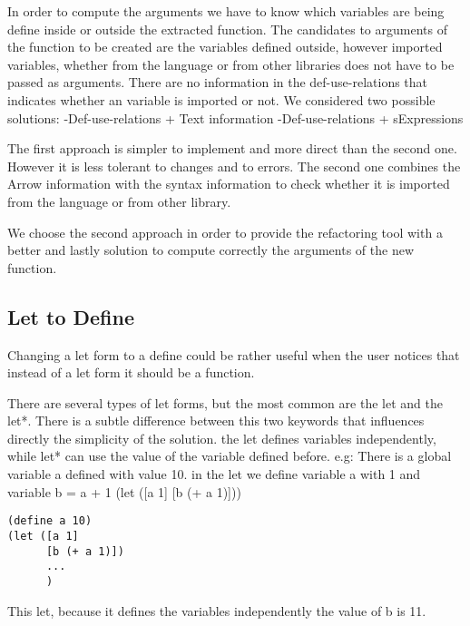 In order to compute the arguments we have to know which variables are being define
inside or outside the extracted function.
The candidates to arguments of the function to be created are the variables defined
outside, however imported variables, whether from the language or from other libraries
does not have to be passed as arguments.
There are no information in the def-use-relations that indicates whether an variable
is imported or not.
We considered two possible solutions:
  -Def-use-relations + Text information
  -Def-use-relations + sExpressions

The first approach is simpler to implement and more direct than the second one.
However it is less tolerant to changes and to errors.
The second one combines the Arrow information with the syntax information to
check whether it is imported from the language or from other library.

We choose the second approach in order to provide the refactoring tool with a
better and lastly solution to compute correctly the arguments of the new function.

\subsection{Let to Define} %
Changing a let form to a define could be rather useful when the user
notices that instead of a let form it should be a function.

There are several types of let forms, but the most common are the let and the let*.
There is a subtle difference between this two keywords that influences directly the simplicity of the solution.
the let defines variables independently, while let* can use the value of the variable defined before.
e.g:
There is a global variable a defined with value 10.
in the let we define variable a with 1 and variable b = a + 1
(let ([a 1]
[b (+ a 1)]))

\begin{lstlisting}[basicstyle=\ttfamily, caption="Example"]
(define a 10)
(let ([a 1]
      [b (+ a 1)])
      ...
      )
\end{lstlisting}
This let, because it defines the variables independently the value of b is 11.

